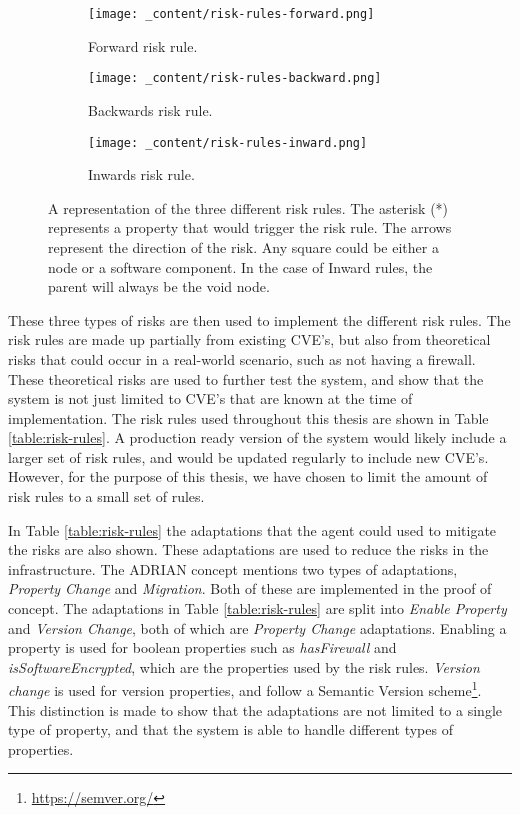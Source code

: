 \begin{figure}[H]
    \begin{subfigure}[b]{0.3\textwidth}
        \centering
        \texttt{[image: \_content/risk-rules-forward.png]}
        \caption{Forward risk rule.}
        \label{fig:risk-rule-forward}
    \end{subfigure}
    \begin{subfigure}[b]{0.3\textwidth}
        \centering
        \texttt{[image: \_content/risk-rules-backward.png]}
        \caption{Backwards risk rule.}
        \label{fig:risk-rule-backward}
    \end{subfigure}
    \begin{subfigure}[b]{0.3\textwidth}
        \centering
        \texttt{[image: \_content/risk-rules-inward.png]}
        \caption{Inwards risk rule.}
        \label{fig:risk-rule-inward}
    \end{subfigure}
    \caption{A representation of the three different risk rules. The asterisk (*) represents a property that would trigger the risk rule. The arrows represent the direction of the risk. Any square could be either a node or a software component. In the case of Inward rules, the parent will always be the void node.}
    \label{fig:risk-rules}
\end{figure}

These three types of risks are then used to implement the different risk rules. The risk rules are made up partially from existing CVE's, but also from theoretical risks that could occur in a real-world scenario, such as not having a firewall. These theoretical risks are used to further test the system, and show that the system is not just limited to CVE's that are known at the time of implementation. The risk rules used throughout this thesis are shown in Table \ref{table:risk-rules}. A production ready version of the system would likely include a larger set of risk rules, and would be updated regularly to include new CVE's. However, for the purpose of this thesis, we have chosen to limit the amount of risk rules to a small set of rules.

In Table \ref{table:risk-rules} the adaptations that the agent could used to mitigate the risks are also shown. These adaptations are used to reduce the risks in the infrastructure. The ADRIAN concept \cite{mann2023ADRIAN} mentions two types of adaptations, \emph{Property Change} and \emph{Migration}. Both of these are implemented in the proof of concept. The adaptations in Table \ref{table:risk-rules} are split into \emph{Enable Property} and \emph{Version Change}, both of which are \emph{Property Change} adaptations. Enabling a property is used for boolean properties such as \emph{hasFirewall} and \emph{isSoftwareEncrypted}, which are the properties used by the risk rules. \emph{Version change} is used for version properties, and follow a Semantic Version scheme\footnote{\url{https://semver.org/}}. This distinction is made to show that the adaptations are not limited to a single type of property, and that the system is able to handle different types of properties.

